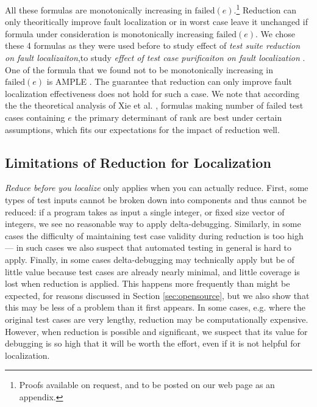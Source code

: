 All these formulas are monotonically increasing in
$\text{failed}(e)$.\footnote{Proofs available on request, and to be posted on our web page as an appendix.} Reduction can only theoritically improve fault localization or in worst case leave it unchanged if formula under consideration is monotonically increasing $\text{failed}(e)$. We chose these 4 formulas as they were used before to study effect of \emph{test suite reduction on fault localizaiton},to study \emph{effect of test case purificaiton on fault localization} \cite{EmpirReduce} \cite{PureTest}. One of the formula that we found not to be monotonically increasing in $\text{failed}(e)$ is AMPLE \cite{AMPLE}. The guarantee that reduction can only improve fault localization effectiveness does not hold for such a case. We note that according the the
theoretical analysis of Xie et al. \cite{Theoretical}, formulas making
number of failed test cases containing $e$ the primary
determinant of rank are best under certain assumptions, which fits
our expectations for the impact of reduction well.



\subsection{Limitations of Reduction for Localization}

\emph{Reduce before you localize} only applies when you can actually
reduce. First, some types of test inputs cannot be broken down into
components and thus cannot be reduced: if a program takes as input a
single integer, or fixed size vector of integers, we see no reasonable
way to apply delta-debugging.  Similarly, in some cases the difficulty
of maintaining test case validity during reduction is too high --- in
such cases we also suspect that automated testing in general is hard
to apply.  Finally, in some cases delta-debugging may technically
apply but be of little value because test cases are already nearly
minimal, and little coverage is lost when reduction is applied.  This
happens more frequently than might be expected, for reasons discussed
in Section \ref{sec:opensource}, but we also show that this may be
less of a problem than it first appears.  In some cases, e.g. where
the original test cases are very lengthy, reduction may be
computationally expensive.  However, when reduction is possible and
significant, we suspect that its value for debugging is so high that
it will be worth the effort, even if it is not helpful for
localization.
